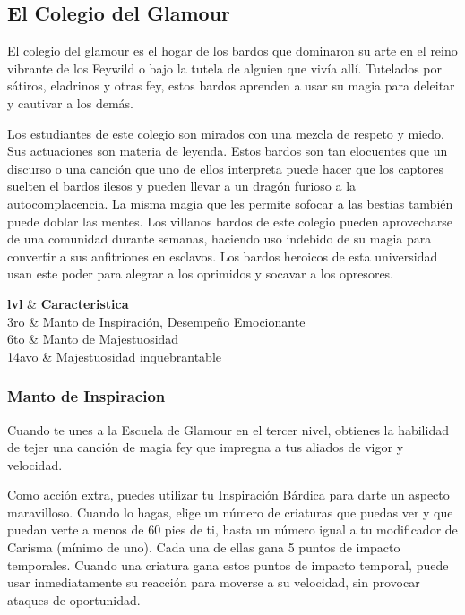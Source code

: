 \documentclass[a4paper,twocolumn,openany,10pt]{dndbook}
\begin{document}
\subsection{El Colegio del Glamour}
El colegio del glamour es el hogar de los bardos que dominaron su arte en el reino vibrante de los Feywild o bajo la tutela de alguien que
vivía allí. Tutelados por sátiros, eladrinos y otras fey, estos bardos aprenden a usar su magia para deleitar y cautivar a los demás.

Los estudiantes de este colegio son mirados con una mezcla de respeto y miedo. Sus actuaciones son materia de leyenda. Estos bardos son tan
elocuentes que un discurso o una canción que uno de ellos interpreta puede hacer que los captores suelten el bardos ilesos y pueden llevar a
un dragón furioso a la autocomplacencia. La misma magia que les permite sofocar a las bestias también puede doblar las mentes. Los villanos
bardos de este colegio pueden aprovecharse de una comunidad durante semanas, haciendo uso indebido de su magia para convertir a sus
anfitriones en esclavos. Los bardos heroicos de esta universidad usan este poder para alegrar a los oprimidos y socavar a los opresores. 

\begin{dndtable}[cX]
  \textbf{lvl} & \textbf{Caracteristica} 						\\
  	3ro		&	Manto de Inspiración, Desempeño Emocionante	\\
	6to		&	Manto de Majestuosidad							\\
	14avo 	&	Majestuosidad inquebrantable					\\
\end{dndtable}

\subsubsection{Manto de Inspiracion}
Cuando te unes a la Escuela de Glamour en el tercer nivel, obtienes la habilidad de tejer una canción de magia fey que impregna a tus aliados
de vigor y velocidad.

Como acción extra, puedes utilizar tu Inspiración Bárdica para darte un aspecto maravilloso. Cuando lo hagas, elige un número de criaturas
que puedas ver y que puedan verte a menos de 60 pies de ti, hasta un número igual a tu modificador de Carisma (mínimo de uno). Cada una de
ellas gana 5 puntos de impacto temporales. Cuando una criatura gana estos puntos de impacto temporal, puede usar inmediatamente su reacción
para moverse a su velocidad, sin provocar ataques de oportunidad.
\end{document}
